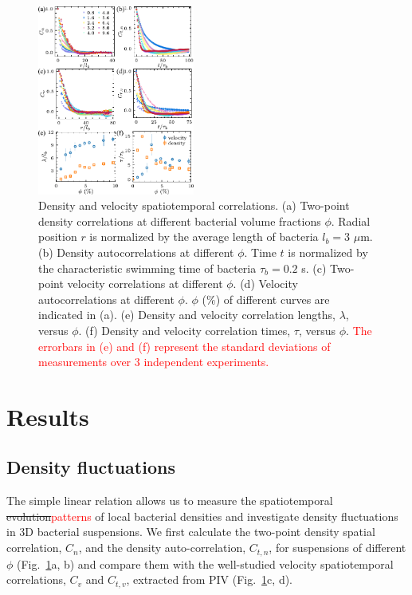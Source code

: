 \documentclass[twocolumn,aps,prx,amsmath,amssymb,longbibliography,superscriptaddress]{revtex4-2}
\begin{document}
\begin{figure}[t]
	\begin{center}
		\includegraphics[width=0.46\textwidth]{Figures/fig-2.pdf}
		\caption[spatiotemporal-correlations.]
		{
			Density and velocity spatiotemporal correlations. (a) Two-point density correlations at different bacterial volume fractions $\phi$. Radial position $r$ is normalized by the average length of bacteria $l_b = 3$ $\mu$m. (b) Density autocorrelations at different $\phi$. Time $t$ is normalized by the characteristic swimming time of bacteria $\tau_b = 0.2$ s. (c) Two-point velocity correlations at different $\phi$. (d) Velocity autocorrelations at different $\phi$. $\phi$ ($\%$) of different curves are indicated in (a). (e) Density and velocity correlation lengths, $\lambda$, versus $\phi$. (f) Density and velocity correlation times, $\tau$, versus $\phi$. \textcolor{red}{The errorbars in (e) and (f) represent the standard deviations of measurements over 3 independent experiments.}
		}
		\label{fig:spatiotemporal-correlations}
	\end{center}
\end{figure}




\section{Results}

\subsection{Density fluctuations}

The simple linear relation allows us to measure the spatiotemporal \sout{evolution}\textcolor{red}{patterns} of local bacterial densities and investigate density fluctuations in 3D bacterial suspensions. We first calculate the two-point density spatial correlation, $C_n$, and the density auto-correlation, $C_{t,n}$, for suspensions of different $\phi$ (Fig.~\ref{fig:spatiotemporal-correlations}a, b) and compare them with the well-studied velocity spatiotemporal correlations, $C_{v}$ and $C_{t,v}$, extracted from PIV (Fig.~\ref{fig:spatiotemporal-correlations}c, d).
\end{document}
